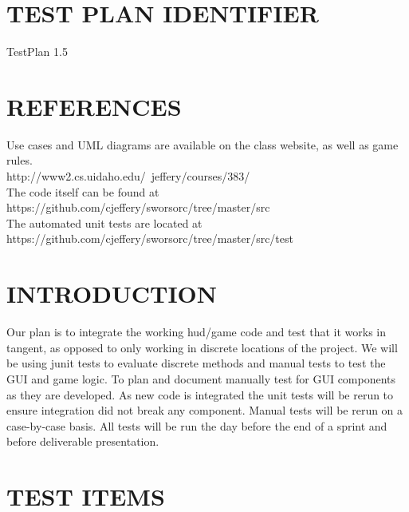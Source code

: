 \setcounter{tocdepth}{9}
\renewcommand\contentsname{}
\tableofcontents

\bigskip

\bigskip
\setcounter{page}{1}\pagestyle{Convertiv}

\section[IDENTIFIER]{\bfseries\color{black}
TEST PLAN IDENTIFIER}

{\color{black}
TestPlan 1.5\\}


\section[REFERENCES]{\bfseries\color{black}
REFERENCES}

{\color{black}
Use cases and UML diagrams are available on the class website, as well as game rules.\\
http://www2.cs.uidaho.edu/~jeffery/courses/383/ \\
The code itself can be found at https://github.com/cjeffery/sworsorc/tree/master/src\\
The automated unit tests are located at https://github.com/cjeffery/sworsorc/tree/master/src/test
}

\section[INTRODUCTION]{\bfseries\color{black} INTRODUCTION}

{\color{black}
Our plan is to integrate the working hud/game code and test that it works in tangent, as opposed to only working in discrete locations of the project. We will be using junit tests to evaluate discrete methods and manual tests to test the GUI and game logic. To plan and document manually test for GUI components as they are developed.  As new code is integrated the unit tests will be rerun to ensure integration did not break any component. Manual tests will be rerun on a case-by-case basis. All tests will be run the day before the end of a sprint and before deliverable presentation.

}

\section[TEST ITEMS]{\bfseries\color{black} TEST ITEMS}

